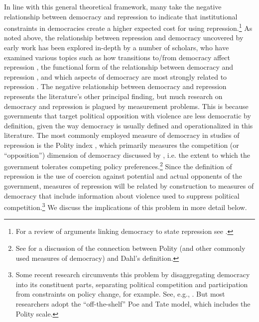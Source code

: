 \documentclass[11pt]{article}
\begin{document}
In line with this general theoretical framework, many take the negative relationship between democracy and repression to indicate that institutional constraints in democracies create a higher expected cost for using repression.\footnote{For a review of arguments linking democracy to state repression see \citet{Davenport2007}.} As noted above, the relationship between repression and democracy uncovered by early work \citep{Henderson1991,PoeTate1994} has been explored in-depth by a number of scholars, who have examined various topics such as how transitions to/from democracy affect repression \citep{Davenport1999}, the functional form of the relationship between democracy and repression \citep{Fein1995,DavenportArmstrong2004}, and which aspects of democracy are most strongly related to repression \citep{BDMetal2005, Davenport2007, ConradMoore2010}. The negative relationship between democracy and repression represents the literature's other principal finding, but much research on democracy and repression is plagued by measurement problems. This is because governments that target political opposition with violence are less democratic by definition, given the way democracy is usually defined and operationalized in this literature. The most commonly employed measure of democracy in studies of repression is the Polity index \citep{MarshallJaggers2009}, which primarily measures the competition (or ``opposition'') dimension of democracy discussed by \citet{Dahl1971}, i.e. the extent to which the government tolerates competing policy preferences.\footnote{See \citet{MunckVerkuilen2002} for a discussion of the connection between Polity (and other commonly used measures of democracy) and Dahl's definition.} Since the definition of repression is the use of coercion against potential and actual opponents of the government, measures of repression will be related by construction to measures of democracy that include information about violence used to suppress political competition.\footnote{Some recent research circumvents this problem by disaggregating democracy into its constituent parts, separating political competition and participation from constraints on policy change, for example. See, e.g., \citet{Davenport2007,DavenportMooreArmstrong2007,ConradMoore2010}. But most researchers adopt the ``off-the-shelf'' Poe and Tate model, which includes the Polity scale.} We discuss the implications of this problem in more detail below. 
\end{document}
